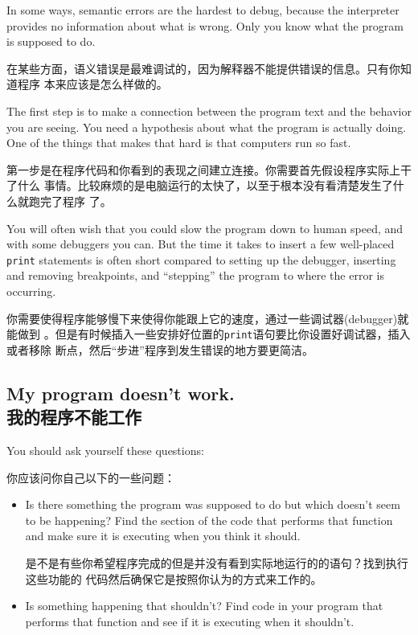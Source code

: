 \documentclass[10pt]{book}
\begin{document}
\begin{CJK}{UTF8}{gbsn}
In some ways, semantic errors are the hardest to debug,
because the interpreter provides no information
about what is wrong.  Only you know what the program is supposed to
do.

在某些方面，语义错误是最难调试的，因为解释器不能提供错误的信息。只有你知道程序
本来应该是怎么样做的。

The first step is to make a connection between the program
text and the behavior you are seeing.  You need a hypothesis
about what the program is actually doing.  One of the things
that makes that hard is that computers run so fast.

第一步是在程序代码和你看到的表现之间建立连接。你需要首先假设程序实际上干了什么
事情。比较麻烦的是电脑运行的太快了，以至于根本没有看清楚发生了什么就跑完了程序
了。

You will often wish that you could slow the program down to human
speed, and with some debuggers you can.  But the time it takes to
insert a few well-placed {\tt print} statements is often short compared to
setting up the debugger, inserting and removing breakpoints, and
``stepping'' the program to where the error is occurring.

你需要使得程序能够慢下来使得你能跟上它的速度，通过一些调试器(debugger)就能做到
。但是有时候插入一些安排好位置的{\tt print}语句要比你设置好调试器，插入或者移除
断点，然后``步进''程序到发生错误的地方要更简洁。

\subsection{My program doesn't work.\\我的程序不能工作}

You should ask yourself these questions:

你应该问你自己以下的一些问题：

\begin{itemize}

\item Is there something the program was supposed to do but
which doesn't seem to be happening?  Find the section of the code
that performs that function and make sure it is executing when
you think it should.

是不是有些你希望程序完成的但是并没有看到实际地运行的的语句？找到执行这些功能的
代码然后确保它是按照你认为的方式来工作的。

\item Is something happening that shouldn't?  Find code in
your program that performs that function and see if it is
executing when it shouldn't.


\end{itemize}
\end{CJK}
\end{document}

